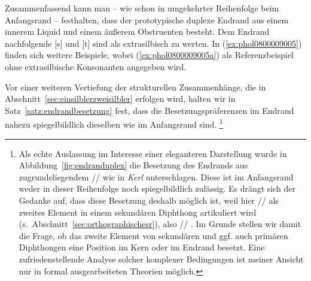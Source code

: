 Zusammenfassend kann man -- wie schon in umgekehrter Reihenfolge beim Anfangsrand -- festhalten, dass der prototypische duplexe Endrand aus einem innerem Liquid und einem äußerem Obstruenten besteht.
Dem Endrand nachfolgende [s] und [t] sind als extrasilbisch zu werten.
In (\ref{ex:phol0800009005}) finden sich weitere Beispiele, wobei (\ref{ex:phol0800009005a}) als Referenzbeispiel ohne extrasilbische Konsonanten angegeben wird.

\begin{exe}
  \ex \label{ex:phol0800009005}
  \begin{xlist}
  \end{xlist}
\end{exe}

Vor einer weiteren Vertiefung der strukturellen Zusammenhänge, die in Abschnitt~\ref{sec:einsilblerzweisilbler} erfolgen wird, halten wir in Satz~\ref{satz:endrandbesetzung} fest, dass die Besetzungspräferenzen im Endrand nahezu spiegelbildlich dieselben wie im Anfangsrand sind.%
\footnote{Als echte Auslassung im Interesse einer eleganteren Darstellung wurde in Abbildung~\ref{fig:endranduplex} die Besetzung des Endrands aus zugrundeliegendem // wie in \textit{Kerl} unterschlagen.
Diese ist im Anfangsrand weder in dieser Reihenfolge noch spiegelbildlich zulässig.
Es drängt sich der Gedanke auf, dass diese Besetzung deshalb möglich ist, weil hier // als zweites Element in einem sekundären Diphthong artikuliert wird (s.\ Abschnitt~\ref{sec:orthographischesr}), also // \phopro \textipa{[k\t{E@}l]}.
Im Grunde stellen wir damit die Frage, ob das zweite Element von sekundären und ggf. auch primären Diphthongen eine Position im Kern oder im Endrand besetzt.
Eine zufriedenstellende Analyse solcher komplexer Bedingungen ist meiner Ansicht nur in formal ausgearbeiteten Theorien möglich.}



